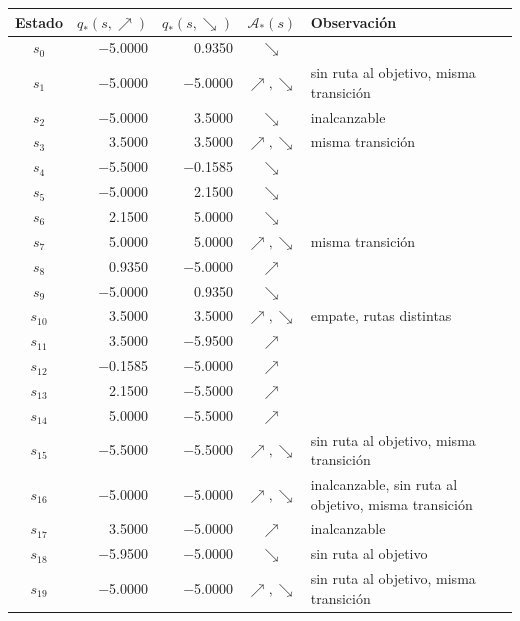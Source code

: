 \begin{tabular}{crrcl}
\toprule
Estado & $q_*(s,\nearrow)$ & $q_*(s,\searrow)$ & $\mathcal{A}_*(s)$ & Observación \\
\midrule
$s_{0}$ & $-$5.0000 & 0.9350 & $\searrow$ &  \\
$s_{1}$ & $-$5.0000 & $-$5.0000 & $\nearrow,\searrow$ & sin ruta al objetivo, misma transición \\
$s_{2}$ & $-$5.0000 & 3.5000 & $\searrow$ & inalcanzable \\
$s_{3}$ & 3.5000 & 3.5000 & $\nearrow,\searrow$ & misma transición \\
$s_{4}$ & $-$5.5000 & $-$0.1585 & $\searrow$ &  \\
$s_{5}$ & $-$5.0000 & 2.1500 & $\searrow$ &  \\
$s_{6}$ & 2.1500 & 5.0000 & $\searrow$ &  \\
$s_{7}$ & 5.0000 & 5.0000 & $\nearrow,\searrow$ & misma transición \\
$s_{8}$ & 0.9350 & $-$5.0000 & $\nearrow$ &  \\
$s_{9}$ & $-$5.0000 & 0.9350 & $\searrow$ &  \\
$s_{10}$ & 3.5000 & 3.5000 & $\nearrow,\searrow$ & empate, rutas distintas \\
$s_{11}$ & 3.5000 & $-$5.9500 & $\nearrow$ &  \\
$s_{12}$ & $-$0.1585 & $-$5.0000 & $\nearrow$ &  \\
$s_{13}$ & 2.1500 & $-$5.5000 & $\nearrow$ &  \\
$s_{14}$ & 5.0000 & $-$5.5000 & $\nearrow$ &  \\
$s_{15}$ & $-$5.5000 & $-$5.5000 & $\nearrow,\searrow$ & sin ruta al objetivo, misma transición \\
$s_{16}$ & $-$5.0000 & $-$5.0000 & $\nearrow,\searrow$ & inalcanzable, sin ruta al objetivo, misma transición \\
$s_{17}$ & 3.5000 & $-$5.0000 & $\nearrow$ & inalcanzable \\
$s_{18}$ & $-$5.9500 & $-$5.0000 & $\searrow$ & sin ruta al objetivo \\
$s_{19}$ & $-$5.0000 & $-$5.0000 & $\nearrow,\searrow$ & sin ruta al objetivo, misma transición \\
\bottomrule
\end{tabular}
